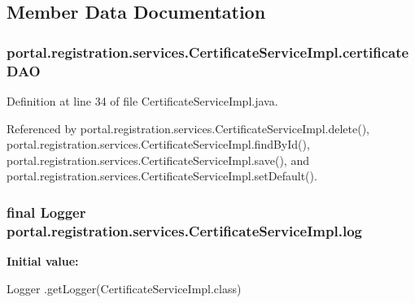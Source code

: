 \subsection{Member Data Documentation}
\hypertarget{classportal_1_1registration_1_1services_1_1CertificateServiceImpl_a427333bd7f98ef4e0a577c9aad7f8b37}{
\subsubsection[{certificateDAO}]{ {\bf portal.registration.services.CertificateServiceImpl.certificateDAO}}}
\label{classportal_1_1registration_1_1services_1_1CertificateServiceImpl_a427333bd7f98ef4e0a577c9aad7f8b37}


Definition at line 34 of file CertificateServiceImpl.java.



Referenced by portal.registration.services.CertificateServiceImpl.delete(), portal.registration.services.CertificateServiceImpl.findById(), portal.registration.services.CertificateServiceImpl.save(), and portal.registration.services.CertificateServiceImpl.setDefault().

\hypertarget{classportal_1_1registration_1_1services_1_1CertificateServiceImpl_a0e66a24ae339beb877a20586517a829f}{
\subsubsection[{log}]{\setlength{\rightskip}{0pt plus 5cm}final Logger {\bf portal.registration.services.CertificateServiceImpl.log}}}
\label{classportal_1_1registration_1_1services_1_1CertificateServiceImpl_a0e66a24ae339beb877a20586517a829f}
{\bfseries Initial value:}
\begin{DoxyCode}
 Logger
                        .getLogger(CertificateServiceImpl.class)
\end{DoxyCode}


